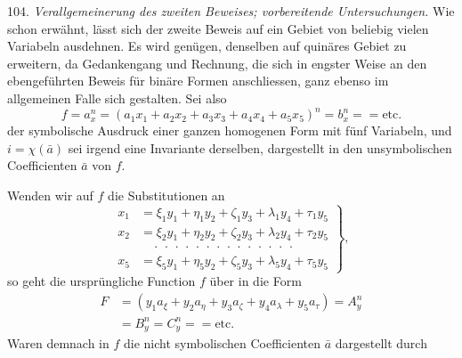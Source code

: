 \documentclass[11pt]{article}
\providecommand{\weq}[2]{\begin{equation}\tag{#1}#2\end{equation}}
\begin{document}
104. \textit{Verallgemeinerung des zweiten Beweises; vorbereitende Untersuchungen.} Wie schon erwähnt, lässt sich der zweite Beweis auf ein Gebiet von beliebig vielen Variabeln ausdehnen. Es wird genügen, denselben auf quinäres Gebiet zu erweitern, da Gedankengang und Rechnung, die sich in engster Weise an den ebengeführten Beweis für binäre Formen anschliessen, ganz ebenso im allgemeinen Falle sich gestalten. Sei also
\[
f = a_x^n = (a_1 x_1 + a_2 x_2 + a_3 x_3 + a_4 x_4 + a_5 x_5)^n = b_x^n = = \text{etc.} %
\]
der symbolische Ausdruck einer ganzen homogenen Form mit fünf Variabeln, und $i = \chi(\bar a)$ sei irgend eine Invariante derselben, dargestellt in den unsymbolischen Coefficienten $\bar a$ von $f$.

Wenden wir auf $f$ die Substitutionen an
\weq{I}{
\left.\begin{aligned}
x_1 &= \xi_1 y_1 + \eta_1 y_2 + \zeta_1 y_3 + \lambda_1 y_4 + \tau_1 y_5\\
x_2 &= \xi_2 y_1 + \eta_2 y_2 + \zeta_2 y_3 + \lambda_2 y_4 + \tau_2 y_5\\
&\quad\cdot\ \cdot\ \cdot\ \cdot\ \cdot\ \cdot\ \cdot\ \cdot\ \cdot\ \cdot\ \cdot\ \cdot\ \cdot\ \cdot\\
x_5 &= \xi_5 y_1 + \eta_5 y_2 + \zeta_5 y_3 + \lambda_5 y_4 + \tau_5 y_5
\end{aligned}\right\},
}
so geht die ursprüngliche Function $f$ über in die Form
\[
\begin{aligned}
F &= (y_1 a_\xi + y_2 a_\eta + y_3 a_\zeta + y_4 a_\lambda + y_5 a_\tau) = A_y^n\\
&= B_y^n = C_y^n = = \text{etc.} %
\end{aligned}
\]
Waren demnach in $f$ die nicht symbolischen Coefficienten $\bar a$ dargestellt durch
\end{document}
